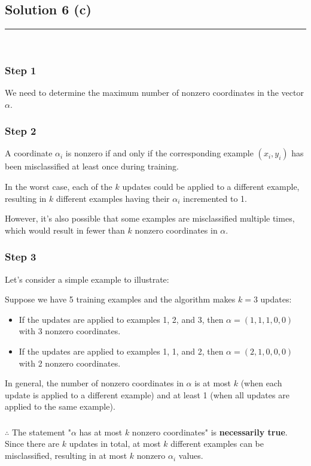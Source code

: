 \documentclass{article}
\begin{document}
\newpage

\subsection*{Solution 6 (c)}
\noindent\rule{\textwidth}{0.4pt}\\

\subsubsection*{Step 1}
\parbox{\textwidth}{
We need to determine the maximum number of nonzero coordinates in the vector $\alpha$.
}

\subsubsection*{Step 2}
\parbox{\textwidth}{
A coordinate $\alpha_i$ is nonzero if and only if the corresponding example $(x_i, y_i)$ has been misclassified at least once during training.

In the worst case, each of the $k$ updates could be applied to a different example, resulting in $k$ different examples having their $\alpha_i$ incremented to 1.

However, it's also possible that some examples are misclassified multiple times, which would result in fewer than $k$ nonzero coordinates in $\alpha$.
}

\subsubsection*{Step 3}
\parbox{\textwidth}{
Let's consider a simple example to illustrate:

Suppose we have 5 training examples and the algorithm makes $k = 3$ updates:
\begin{itemize}
    \item If the updates are applied to examples 1, 2, and 3, then $\alpha = (1, 1, 1, 0, 0)$ with 3 nonzero coordinates.
    \item If the updates are applied to examples 1, 1, and 2, then $\alpha = (2, 1, 0, 0, 0)$ with 2 nonzero coordinates.
\end{itemize}

In general, the number of nonzero coordinates in $\alpha$ is at most $k$ (when each update is applied to a different example) and at least 1 (when all updates are applied to the same example).
}

\subsubsection*{\normalfont}{$\therefore$ The statement "$\alpha$ has at most $k$ nonzero coordinates" is \textbf{necessarily true}. Since there are $k$ updates in total, at most $k$ different examples can be misclassified, resulting in at most $k$ nonzero $\alpha_i$ values.}
\end{document}
